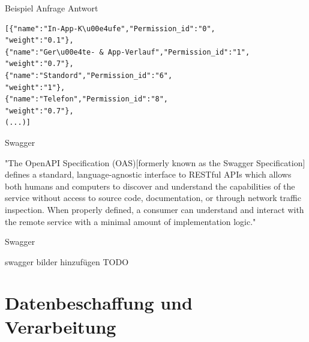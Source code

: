 \documentclass[compress,t]{beamer}
\begin{document}
\begin {frame}[fragile]{Beispiel Anfrage Antwort}

    \begin{center}
            \begin{lstlisting}
[{"name":"In-App-K\u00e4ufe","Permission_id":"0",
"weight":"0.1"},
{"name":"Ger\u00e4te- & App-Verlauf","Permission_id":"1",
"weight":"0.7"},
{"name":"Standord","Permission_id":"6",
"weight":"1"},
{"name":"Telefon","Permission_id":"8",
"weight":"0.7"},
(...)]
            \end{lstlisting}
    \end{center}

\end{frame}

\begin {frame}{Swagger}

    \begin{center}
         "The OpenAPI Specification (OAS)[formerly known as the Swagger Specification] defines a standard, language-agnostic interface to RESTful APIs which allows both humans and computers to discover and understand the capabilities of the service without access to source code, documentation, or through network traffic inspection. When properly defined, a consumer can understand and interact with the remote service with a minimal amount of implementation logic."

    \end{center}

\end{frame}

\begin {frame}{Swagger}

    \begin{center}
         swagger bilder hinzufügen TODO

    \end{center}

\end{frame}

\section{Datenbeschaffung und Verarbeitung}
\end{document}
